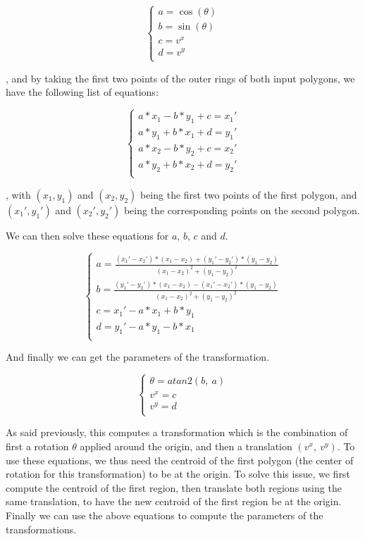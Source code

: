 \[
    \begin{cases}
        a = \cos(\theta) \\
        b = \sin(\theta) \\
        c = v^x          \\
        d = v^y          \\
    \end{cases}
\]

, and by taking the first two points of the outer rings of both input polygons, we have the following list of equations:

\[
    \begin{cases}
        a*x_1 - b*y_1 + c = x_1' \\
        a*y_1 + b*x_1 + d = y_1' \\
        a*x_2 - b*y_2 + c = x_2' \\
        a*y_2 + b*x_2 + d = y_2' \\
    \end{cases}
\]

, with $(x_1, y_1)$ and $(x_2, y_2)$ being the first two points of the first polygon, and $(x_1', y_1')$ and $(x_2', y_2')$ being the corresponding points on the second polygon.

We can then solve these equations for $a$, $b$, $c$ and $d$.

\[
    \begin{cases}
        a = \frac{(x_1' - x_2')*(x_1 - x_2) + (y_1' - y_2')*(y_1 - y_2)}{(x_1 - x_2)^2 + (y_1 - y_2)^2}\\
        b = \frac{(y_1' - y_2')*(x_1 - x_2) - (x_1' - x_2')*(y_1 - y_2)}{(x_1 - x_2)^2 + (y_1 - y_2)^2}\\
        c = x_1' - a*x_1 + b*y_1 \\
        d = y_1' - a*y_1 - b*x_1 \\
    \end{cases}
\]

And finally we can get the parameters of the transformation.

\[
    \begin{cases}
        \theta = atan2(b,\ a) \\
        v^x = c \\
        v^y = d \\
    \end{cases}
\]

As said previously, this computes a transformation which is the combination of first a rotation $\theta$ applied around the origin, and then a translation $(v^x,\ v^y)$. To use these equations, we thus need the centroid of the first polygon (the center of rotation for this transformation) to be at the origin. To solve this issue, we first compute the centroid of the first region, then translate both regions using the same translation, to have the new centroid of the first region be at the origin. Finally we can use the above equations to compute the parameters of the transformations.

